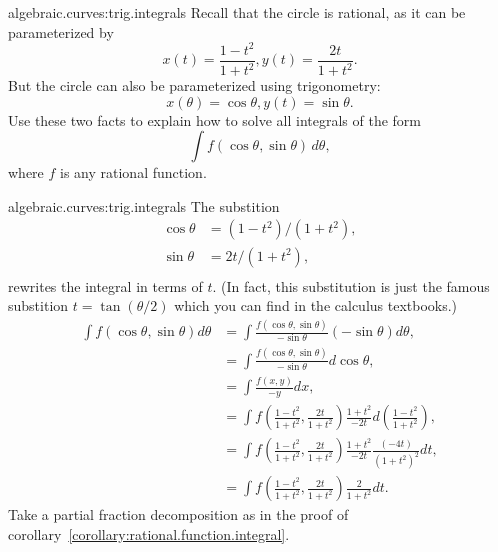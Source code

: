 \begin{problem}{algebraic.curves:trig.integrals}
Recall that the circle is rational, as it can be parameterized by
\[
x(t)=\frac{1-t^2}{1+t^2}, y(t)=\frac{2t}{1+t^2}.
\]
But the circle can also be parameterized using trigonometry:
\[
x(\theta)=\cos \theta, y(t)=\sin \theta.
\]
Use these two facts to explain how to solve all integrals of the form
\[
\int f(\cos \theta, \sin \theta) \, d\theta,
\]
where \(f\) is any rational function.
\end{problem}
\begin{answer}{algebraic.curves:trig.integrals}
The substition
\begin{align*}
\cos \theta&=(1-t^2)/(1+t^2), \\
\sin \theta&=2t/(1+t^2), \\
\end{align*}
rewrites the integral in terms of \(t\). 
(In fact, this substitution is just the famous substition \(t=\tan(\theta/2)\) which you can find in the calculus textbooks.)
\begin{align*}
\int f(\cos \theta,\sin \theta) d\theta
&=
\int \frac{f(\cos \theta,\sin \theta)}{-\sin \theta}(-\sin \theta) d \theta,
\\
&=
\int \frac{f(\cos \theta,\sin \theta)}{-\sin \theta}d \cos \theta,
\\
&=
\int \frac{f(x,y)}{-y}dx,
\\
&=
\int f\left(\frac{1-t^2}{1+t^2},\frac{2t}{1+t^2}\right)\frac{1+t^2}{-2t}d(\frac{1-t^2}{1+t^2}),
\\
&=
\int f\left(\frac{1-t^2}{1+t^2},\frac{2t}{1+t^2}\right)\frac{1+t^2}{-2t}\frac{(-4t)}{(1+t^2)^2} dt,
\\
&=
\int f\left(\frac{1-t^2}{1+t^2},\frac{2t}{1+t^2}\right)\frac{2}{1+t^2}dt.
\end{align*}
Take a partial fraction decomposition as in the proof of corollary~\vref{corollary:rational.function.integral}.
\end{answer}

